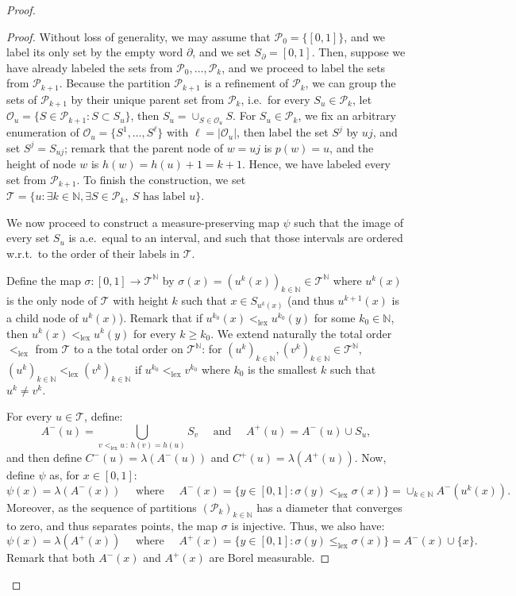 \documentclass{amsart}
\newcommand{\wrt}{w.r.t.\ }
\newcommand{\aE}{a.e.\ }
\newcommand{\ie}{i.e.\ }
\theoremstyle{plain}
\theoremstyle{definition}
\newcommand{\cO}{\mathcal{O}}
\newcommand{\cP}{\mathcal{P}}
\newcommand{\cT}{\mathcal{T}}
\newcommand{\rooot}{\partial} %
\newcommand{\N}{\mathbb{N}}
\newcommand{\leqlex}{\leq_{\mathrm{lex}}}
\newcommand{\linflex}{<_{\mathrm{lex}}}
\begin{document}
\begin{proof}
\begin{proof}
Without loss of generality,  we may assume that $\cP_0 = \{ [0,1] \}$,
and we label its only set by the empty word $\rooot$, and we set $S_{\rooot} = [0,1]$.
Then, suppose we have already labeled the sets from $\cP_0, \dots, \cP_k$,
and we proceed to label the sets from $\cP_{k+1}$.
Because the partition $\cP_{k+1}$ is a refinement of $\cP_k$,
we can group the sets of $\cP_{k+1}$ by their unique parent set from $\cP_k$,
\ie for every $S_u\in\cP_k$, let $\cO_u = \{ S\in\cP_{k+1} : S \subset S_u \}$,
then $S_u = \cup_{S\in\cO_u} S$.
For $S_u\in\cP_k$, we fix an arbitrary enumeration of $\cO_u = \{ S^1, \dots, S^\ell \}$
	with $\ell = \vert \cO_u \vert$,
then label the set $S^j$ by $uj$, and set $S^j = S_{u j}$;
remark that the parent node of $w=u j$ is $p(w)=u$,
and the height of node $w$ is $h(w) = h(u) + 1 = k+1$.
Hence, we have labeled every set from $\cP_{k+1}$.
To finish the construction, we set 
	$\cT = \{ u : \exists k\in\N, \exists S\in\cP_k,\ S \text{ has label } u \}$.
\medskip

We now proceed to construct a measure-preserving map $\psi$
such that the image of every set $S_u$ is \aE equal to an interval,
and such that those intervals are ordered \wrt to the order of their labels in $\cT$.

Define the map $\sigma : [0,1] \to \cT^\N$ by
$\sigma(x) = (u^k(x) )_{k\in\N} \in \cT^\N$ 
where $u^k(x)$ is the only node of $\cT$ with height $k$
such that $x\in S_{u^k(x)}$
(and thus $u^{k+1}(x)$ is a child node of $u^k(x)$).
Remark that if $u^{k_0}(x) \linflex u^{k_0}(y)$ for some $k_0\in\N$,
	then $u^{k}(x) \linflex u^{k}(y)$ for every $k\geq k_0$.
We extend naturally the total order $\linflex$ from $\cT$ to a the total order on $\cT^\N$:
	for $(u^k)_{k\in\N}, (v^k)_{k\in\N}\in\cT^\N$,
	$(u^k)_{k\in\N} \linflex (v^k)_{k\in\N}$
	if $u^{k_0} \linflex v^{k_0}$ where $k_0$ is the smallest $k$
		such that $u^k \neq v^k$.

For every $u\in\cT$, define:
\[ A^-(u) = \bigcup_{v \linflex u \, : \, h(v)=h(u)} S_v 
\quad \text{ and } \quad
A^+(u) = A^-(u) \cup S_u
, \]
and then define $C^-(u) = \lambda(A^-(u))$ and $C^+(u) = \lambda(A^+(u))$.
Now, define $\psi$ as, for $x\in [0,1]$:
\[ \psi(x) = \lambda(A^-(x))
\quad \text{ where }\quad
A^-(x) = \{ y\in [0,1] : \sigma(y) \linflex \sigma(x) \}
= \cup_{k\in\N} A^-(u^k(x))
. \]
Moreover, as the sequence of partitions $(\cP_k)_{k\in\N}$ 
	has a diameter that converges to zero, and thus separates points,
	the map $\sigma$ is injective.
Thus, we also have:
\[ \psi(x) = \lambda(A^+(x))
\quad \text{ where }\quad
A^+(x) = \{ y\in [0,1] : \sigma(y) \leqlex \sigma(x) \}
= A^-(x) \cup \{ x \}
. \]
Remark that both $A^-(x)$ and $A^+(x)$ are Borel measurable.


\end{proof}
\end{proof}
\end{document}
